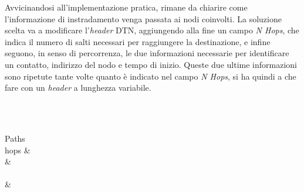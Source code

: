 \documentclass[12pt,a4paper,oneside]{book}
\begin{document}
		Avvicinandosi all'implementazione pratica, rimane da chiarire come l'informazione di instradamento venga passata ai nodi coinvolti. La soluzione scelta va a modificare l'{\it header} DTN, aggiungendo alla fine un campo \emph{N Hops}, che indica il numero di salti necessari per raggiungere la destinazione, e infine seguono, in senso di percorrenza, le due informazioni necessarie per identificare un contatto, indirizzo del nodo e tempo di inizio. Queste due ultime informazioni sono ripetute tante volte quanto è indicato nel campo \emph{N Hops}, si ha quindi a che fare con un {\it header} a lunghezza variabile.
		
		\vspace{25pt}
		\begin{bytefield}[bitwidth=0.5em]{64}
			 \\
			 \\
			
			\begin{rightwordgroup}{Paths \\ hops}
				 &  \\
				 &  \\
				 \\[1ex]
				 & 
			\end{rightwordgroup}
			
		\end{bytefield}
		\vspace{25pt}
		
\end{document}
